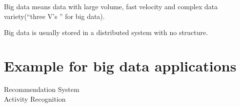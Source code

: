 \documentclass[11pt]{article}
\begin{document}
Big data means data with large volume, fast velocity and complex data variety(“three V’s ” for big data).

Big data is usually stored in a distributed system with no structure.

\section{Example for big data applications}

\begin{description}
\item[Recommendation System]
\item[Activity Recognition]
\end{description}



\end{document}
